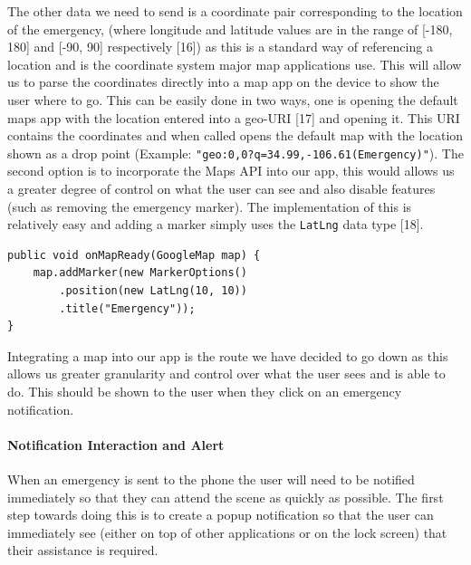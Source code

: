 \documentclass{article}
\begin{document}
The other data we need to send is a coordinate pair corresponding to the location of the emergency, (where longitude and latitude values are in the range of [-180, 180] and [-90, 90] respectively [16]) as this is a standard way of referencing a location and is the coordinate system major map applications use. This will allow us to parse the coordinates directly into a map app on the device to show the user where to go. This can be easily done in two ways, one is opening the default maps app with the location entered into a geo-URI [17] and opening it. This URI contains the coordinates and when called opens the default map with the location shown as a drop point (Example: \texttt{\color{OliveGreen}"geo:0,0?q=34.99,-106.61(Emergency)"}). The second option is to incorporate the Maps API into our app, this would allows us a greater degree of control on what the user can see and also disable features (such as removing the emergency marker). The implementation of this is relatively easy and adding a marker simply uses the \texttt{\color{OliveGreen}LatLng} data type [18].
\lstset{language=Java}
\begin{lstlisting}
public void onMapReady(GoogleMap map) {
    map.addMarker(new MarkerOptions()
        .position(new LatLng(10, 10))
        .title("Emergency"));
}
\end{lstlisting}
\lstset{language=XML}
Integrating a map into our app is the route we have decided to go down as this allows us greater granularity and control over what the user sees and is able to do. This should be shown to the user when they click on an emergency notification.\\

\paragraph{Notification Interaction and Alert}
When an emergency is sent to the phone the user will need to be notified immediately so that they can attend the scene as quickly as possible. The first step towards doing this is to create a popup notification so that the user can immediately see (either on top of other applications or on the lock screen) that their assistance is required.\\
\end{document}
